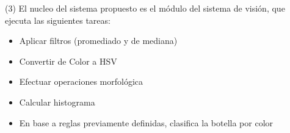 \begin{frame}{ (3)}
El nucleo del sistema propuesto es el módulo del sistema de visión, que ejecuta las siguientes tareas:
\begin{itemize}
        \item Aplicar filtros (promediado y de mediana)
        \item Convertir de Color a HSV
        \item Efectuar operaciones morfológica
        \item Calcular histograma
        \item En base a reglas previamente definidas, clasifica la botella por color
	\end{itemize}


\end{frame}


